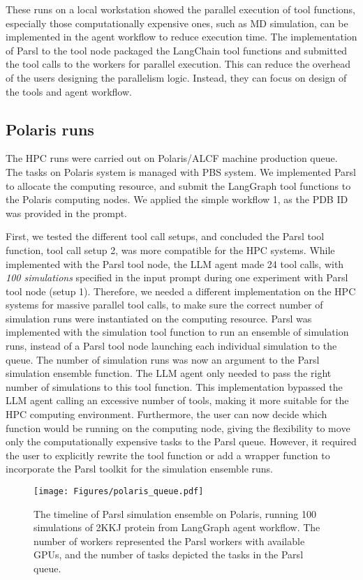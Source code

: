 These runs on a local workstation showed the parallel execution of tool functions, especially those computationally expensive ones, such as MD simulation, can be implemented in the agent workflow to reduce execution time. 
The implementation of Parsl to the tool node packaged the LangChain tool functions and submitted the tool calls to the workers for parallel execution. 
This can reduce the overhead of the users designing the parallelism logic. Instead, they can focus on design of the tools and agent workflow. 


\subsection{Polaris runs}
The HPC runs were carried out on Polaris/ALCF machine production queue. 
The tasks on Polaris system is managed with PBS system.  
We implemented Parsl to allocate the computing resource, and submit the LangGraph tool functions to the Polaris computing nodes. 
We applied the simple workflow 1, as the PDB ID was provided in the prompt. 

First, we tested the different tool call setups, and concluded the Parsl tool function, tool call setup 2, was more compatible for the HPC systems. 
While implemented with the Parsl tool node, the LLM agent made 24 tool calls, with \emph{100 simulations} specified in the input prompt during one experiment with Parsl tool node (setup 1). 
Therefore, we needed a different implementation on the HPC systems for massive parallel tool calls, to make sure the correct number of simulation runs were instantiated on the computing resource. 
Parsl was implemented with the simulation tool function to run an ensemble of simulation runs, instead of a Parsl tool node launching each individual simulation to the queue. 
The number of simulation runs was now an argument to the Parsl simulation ensemble function. 
The LLM agent only needed to pass the right number of simulations to this tool function. 
This implementation bypassed the LLM agent calling an excessive number of tools, making it more suitable for the HPC computing environment. 
Furthermore, the user can now decide which function would be running on the computing node, giving the flexibility to move only the computationally expensive tasks to the Parsl queue.  
However, it required the user to explicitly rewrite the tool function or add a wrapper function to incorporate the Parsl toolkit for the simulation ensemble runs. 

\begin{figure}
    \centering
    \texttt{[image: Figures/polaris\_queue.pdf]}
    \caption{The timeline of Parsl simulation ensemble on Polaris, running 100 simulations of 2KKJ protein from LangGraph agent workflow. The number of workers represented the Parsl workers with available GPUs, and the number of tasks depicted the tasks in the Parsl queue. }
    \Description{}
    \label{fig:polaris_run}
\end{figure}

